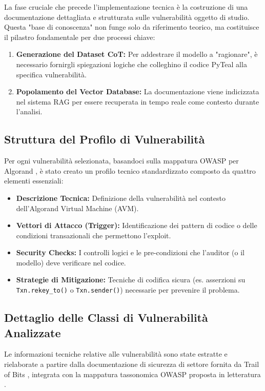 La fase cruciale che precede l'implementazione tecnica è la costruzione di una documentazione dettagliata e strutturata sulle vulnerabilità oggetto di studio. Questa "base di conoscenza" non funge solo da riferimento teorico, ma costituisce il pilastro fondamentale per due processi chiave:
\begin{enumerate}
    \item \textbf{Generazione del Dataset CoT:} Per addestrare il modello a "ragionare", è necessario fornirgli spiegazioni logiche che colleghino il codice PyTeal alla specifica vulnerabilità.
    \item \textbf{Popolamento del Vector Database:} La documentazione viene indicizzata nel sistema RAG per essere recuperata in tempo reale come contesto durante l'analisi.
\end{enumerate}

\subsection{Struttura del Profilo di Vulnerabilità}
Per ogni vulnerabilità selezionata, basandoci sulla mappatura OWASP per Algorand \cite{boi2025}, è stato creato un profilo tecnico standardizzato composto da quattro elementi essenziali:

\begin{itemize}
    \item \textbf{Descrizione Tecnica:} Definizione della vulnerabilità nel contesto dell'Algorand Virtual Machine (AVM).
    \item \textbf{Vettori di Attacco (Trigger):} Identificazione dei pattern di codice o delle condizioni transazionali che permettono l'exploit.
    \item \textbf{Security Checks:} I controlli logici e le pre-condizioni che l'auditor (o il modello) deve verificare nel codice.
    \item \textbf{Strategie di Mitigazione:} Tecniche di codifica sicura (es. asserzioni su \texttt{Txn.rekey\_to()} o \texttt{Txn.sender()}) necessarie per prevenire il problema.
\end{itemize}

\subsection{Dettaglio delle Classi di Vulnerabilità Analizzate}
Le informazioni tecniche relative alle vulnerabilità sono state estratte e rielaborate a partire dalla documentazione di sicurezza di settore fornita da Trail of Bits \cite{trailofbits_algorand}, integrata con la mappatura tassonomica OWASP proposta in letteratura \cite{boi2025}.

